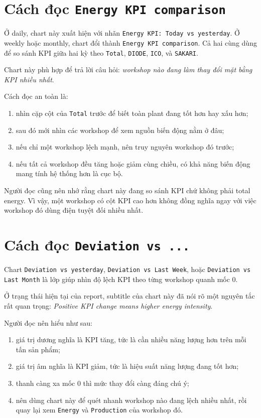 \section{Cách đọc \texttt{Energy KPI comparison}}

Ở daily, chart này xuất hiện với nhãn \texttt{Energy KPI: Today vs yesterday}. Ở weekly hoặc monthly, chart đổi thành \texttt{Energy KPI comparison}. Cả hai cùng dùng để so sánh KPI giữa hai kỳ theo \texttt{Total}, \texttt{DIODE}, \texttt{ICO}, và \texttt{SAKARI}.

Chart này phù hợp để trả lời câu hỏi: \textit{workshop nào đang làm thay đổi mặt bằng KPI nhiều nhất}.

Cách đọc an toàn là:

\begin{enumerate}[label=-]
\item nhìn cặp cột của \texttt{Total} trước để biết toàn plant đang tốt hơn hay xấu hơn;
\item sau đó mới nhìn các workshop để xem nguồn biến động nằm ở đâu;
\item nếu chỉ một workshop lệch mạnh, nên truy nguyên workshop đó trước;
\item nếu tất cả workshop đều tăng hoặc giảm cùng chiều, có khả năng biến động mang tính hệ thống hơn là cục bộ.
\end{enumerate}

Người đọc cũng nên nhớ rằng chart này đang so sánh KPI chứ không phải total energy. Vì vậy, một workshop có cột KPI cao hơn không đồng nghĩa ngay với việc workshop đó dùng điện tuyệt đối nhiều nhất.

\section{Cách đọc \texttt{Deviation vs ...}}

Chart \texttt{Deviation vs yesterday}, \texttt{Deviation vs Last Week}, hoặc \texttt{Deviation vs Last Month} là lớp giúp nhìn độ lệch KPI theo từng workshop quanh mốc 0.

Ở trạng thái hiện tại của report, subtitle của chart này đã nói rõ một nguyên tắc rất quan trọng: \textit{Positive KPI change means higher energy intensity}.

Người đọc nên hiểu như sau:

\begin{enumerate}[label=-]
\item giá trị dương nghĩa là KPI tăng, tức là cần nhiều năng lượng hơn trên mỗi tấn sản phẩm;
\item giá trị âm nghĩa là KPI giảm, tức là hiệu suất năng lượng đang tốt hơn;
\item thanh càng xa mốc 0 thì mức thay đổi càng đáng chú ý;
\item nên dùng chart này để quét nhanh workshop nào đang lệch nhiều nhất, rồi quay lại xem \texttt{Energy} và \texttt{Production} của workshop đó.
\end{enumerate}

